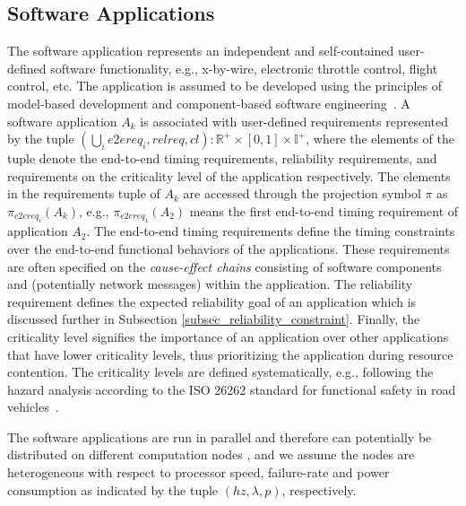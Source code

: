 \subsection{Software Applications}
The software application represents an independent and self-contained user-defined software functionality, e.g., x-by-wire, electronic throttle control, flight control, etc. The application is assumed to be developed using the principles of model-based development and component-based software engineering~\cite{softwarecomponents}\cite{Crnkovic2002BuildingSystems}. A software application $A_k$ is associated with user-defined requirements represented by the tuple $(\bigcup_i e2ereq_i,relreq,cl):\mathbb{R}^+\times [0,1]\times \mathbb{I}^+$, where the elements of the tuple denote the end-to-end timing requirements, reliability requirements, and requirements on the criticality level of the application respectively. The elements in the requirements tuple of $A_k$ are accessed through the projection symbol $\pi$ as $\pi_{e2ereq_i}(A_k)$, e.g., $\pi_{e2ereq_1}(A_2)$ means the first end-to-end timing requirement of application $A_2$. The end-to-end timing requirements define the timing constraints over the end-to-end functional behaviors of the applications. These requirements are often specified on the \textit{cause-effect chains} consisting of software components and (potentially network messages) within the application. The reliability requirement defines the expected reliability goal of an application which is discussed further in Subsection \ref{subsec_reliability_constraint}. Finally, the criticality level signifies the importance of an application over other applications that have lower criticality levels, thus prioritizing the application during resource contention. The criticality levels are defined systematically, e.g., following the hazard analysis according to the ISO 26262 standard for functional safety in road vehicles~\cite{iso201126262}. 


The software applications are run in parallel and therefore can potentially be distributed on different computation nodes , and we assume the nodes are heterogeneous with respect to processor speed, failure-rate and power consumption as indicated by the tuple $(hz, \lambda, p)$, respectively. 

